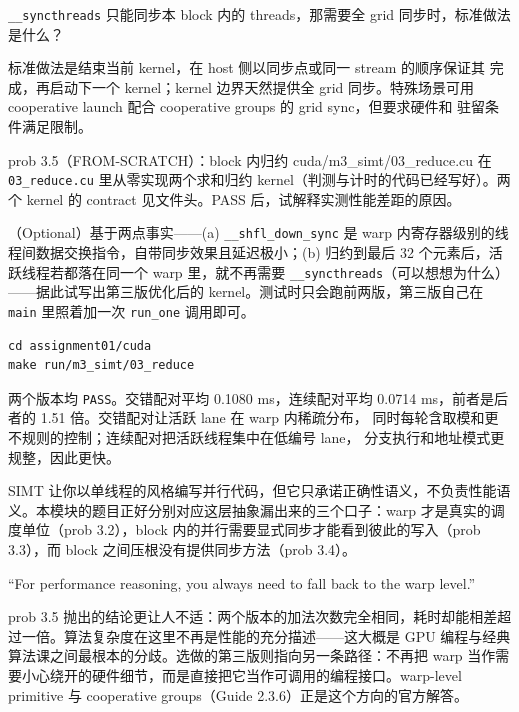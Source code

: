 \documentclass[11pt,a4paper,fontset=fandol]{ctexart}
\begin{document}
\texttt{\_\_syncthreads} 只能同步本 block 内的 threads，那需要全 grid 同步时，标准做法是什么？

\begin{answer}
标准做法是结束当前 kernel，在 host 侧以同步点或同一 stream 的顺序保证其
完成，再启动下一个 kernel；kernel 边界天然提供全 grid 同步。特殊场景可用
cooperative launch 配合 cooperative groups 的 grid sync，但要求硬件和
驻留条件满足限制。
\end{answer}

\begin{capstone}{prob 3.5（FROM-SCRATCH）：block 内归约 \hfill {\footnotesize\ttfamily cuda/m3\_simt/03\_reduce.cu}}
在 \texttt{03\_reduce.cu} 里从零实现两个求和归约 kernel（判测与计时的代码已经写好）。两个 kernel 的 contract 见文件头。PASS 后，试解释实测性能差距的原因。

（Optional）基于两点事实——(a) \texttt{\_\_shfl\_down\_sync} 是 warp 内寄存器级别的线程间数据交换指令，自带同步效果且延迟极小；(b) 归约到最后 32 个元素后，活跃线程若都落在同一个 warp 里，就不再需要 \texttt{\_\_syncthreads}（可以想想为什么）——据此试写出第三版优化后的 kernel。测试时只会跑前两版，第三版自己在 \texttt{main} 里照着加一次 \texttt{run\_one} 调用即可。
\end{capstone}

\begin{lstlisting}
cd assignment01/cuda
make run/m3_simt/03_reduce
\end{lstlisting}

\begin{answer}
两个版本均 \texttt{PASS}。交错配对平均 0.1080 ms，连续配对平均
0.0714 ms，前者是后者的 1.51 倍。交错配对让活跃 lane 在 warp 内稀疏分布，
同时每轮含取模和更不规则的控制；连续配对把活跃线程集中在低编号 lane，
分支执行和地址模式更规整，因此更快。
\end{answer}

\begin{lookback}
SIMT 让你以单线程的风格编写并行代码，但它只承诺正确性语义，不负责性能语义。本模块的题目正好分别对应这层抽象漏出来的三个口子：warp 才是真实的调度单位（prob 3.2），block 内的并行需要显式同步才能看到彼此的写入（prob 3.3），而 block 之间压根没有提供同步方法（prob 3.4）。

``For performance reasoning, you always need to fall back to the warp level.''

prob 3.5 抛出的结论更让人不适：两个版本的加法次数完全相同，耗时却能相差超过一倍。算法复杂度在这里不再是性能的充分描述——这大概是 GPU 编程与经典算法课之间最根本的分歧。选做的第三版则指向另一条路径：不再把 warp 当作需要小心绕开的硬件细节，而是直接把它当作可调用的编程接口。warp-level primitive 与 cooperative groups（Guide 2.3.6）正是这个方向的官方解答。
\end{lookback}
\end{document}
